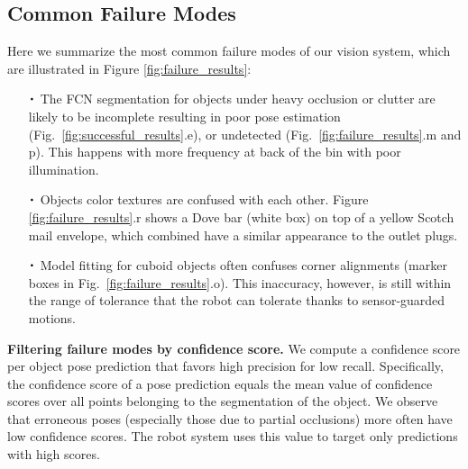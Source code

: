 \documentclass[letterpaper, 10 pt, conference]{ieeeconf}  %
\newcommand*{\Cdot}{\raisebox{-0.25ex}{\scalebox{1.75}{$\cdot$}}}
\newcommand{\myparagraph}[1]{\vspace{0.1in}\noindent\textbf{#1}}
\begin{document}
\subsection{Common Failure Modes} 
Here we summarize the most common failure modes of our vision system, which are illustrated in Figure \ref{fig:failure_results}: 
\begin{itemize}
    \item[$\Cdot$] The FCN segmentation for objects under heavy occlusion or clutter are likely to be incomplete resulting in poor pose estimation (Fig.~\ref{fig:successful_results}.e), or undetected (Fig.~\ref{fig:failure_results}.m and p). This happens with more frequency at back of the bin with poor illumination. %
    \item[$\Cdot$] Objects color textures are confused with each other. Figure \ref{fig:failure_results}.r shows a Dove bar (white box) on top of a yellow Scotch mail envelope, which combined have a similar appearance to the outlet plugs.
    \item[$\Cdot$] Model fitting for cuboid objects often confuses corner alignments (marker boxes in Fig.~\ref{fig:failure_results}.o). This inaccuracy, however, is still within the range of tolerance that the robot can tolerate thanks to sensor-guarded motions.
\end{itemize}




\myparagraph{Filtering failure modes by confidence score.} 
We compute a confidence score per object pose prediction that favors high precision for low recall. 
Specifically, the confidence score of a pose prediction equals the mean value of confidence scores over all points belonging to the segmentation of the object. 
We observe that erroneous poses (especially those due to partial occlusions) more often have low confidence scores.
The robot system uses this value to target only predictions with high scores.
\end{document}
